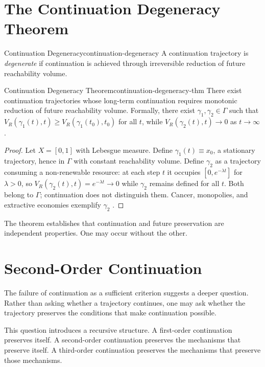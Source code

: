 \documentclass[12pt,twoside,openright]{book}
\begin{document}
\section{The Continuation Degeneracy Theorem}
\label{sec:ch10-degeneracy}

\begin{definition}{Continuation Degeneracy}{continuation-degeneracy}
  A continuation trajectory is \emph{degenerate} if
  continuation is achieved through irreversible reduction
  of future reachability volume.
\end{definition}

\begin{theorem}{Continuation Degeneracy Theorem}{continuation-degeneracy-thm}
  There exist continuation trajectories whose long-term
  continuation requires monotonic reduction of future
  reachability volume. Formally, there exist
  $\gamma_1,\gamma_2\in\Gamma$ such that
  $V_R(\gamma_1(t),t)\ge V_R(\gamma_1(t_0),t_0)$ for all
  $t$, while $V_R(\gamma_2(t),t)\to0$ as $t\to\infty$.
\end{theorem}

\begin{proof}
  Let $X=[0,1]$ with Lebesgue measure. Define
  $\gamma_1(t)\equiv x_0$, a stationary trajectory, hence
  in $\Gamma$ with constant reachability volume. Define
  $\gamma_2$ as a trajectory consuming a non-renewable
  resource: at each step $t$ it occupies $[0,e^{-\lambda t}]$
  for $\lambda>0$, so $V_R(\gamma_2(t),t)=e^{-\lambda t}\to0$
  while $\gamma_2$ remains defined for all $t$. Both belong
  to $\Gamma$; continuation does not distinguish them.
  Cancer, monopolies, and extractive economies exemplify
  $\gamma_2$ \parencite{ostrom1990,meadows2008}.
\end{proof}

The theorem establishes that continuation and future
preservation are independent properties. One may occur
without the other.

\section{Second-Order Continuation}
\label{sec:ch10-second-order}

The failure of continuation as a sufficient criterion
suggests a deeper question. Rather than asking whether a
trajectory continues, one may ask whether the trajectory
preserves the conditions that make continuation possible.

This question introduces a recursive structure. A
first-order continuation preserves itself. A second-order
continuation preserves the mechanisms that preserve itself.
A third-order continuation preserves the mechanisms that
preserve those mechanisms.
\end{document}
